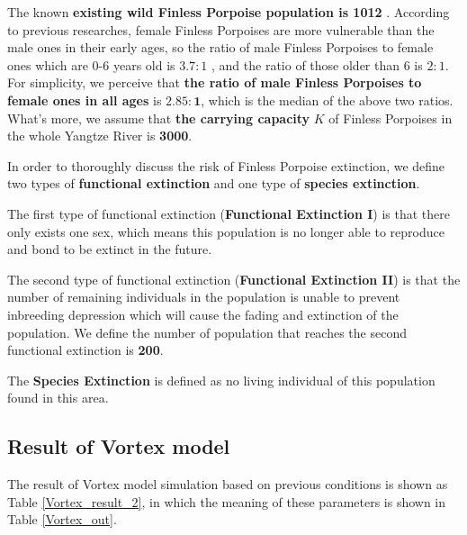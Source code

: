 \documentclass{mcmthesis}
\numberwithin{figure}{section}
\numberwithin{table}{section}
\numberwithin{equation}{section}
\begin{document}
The known \textbf{existing wild Finless Porpoise population is 1012} \citep*{Wubin}. 
According to previous researches, female Finless Porpoises are more
vulnerable than the male ones in their early ages, so the ratio of 
male Finless Porpoises to female ones which are 0-6 years old is $ 3.7:1 $
\citep*{ZhouZhao},
and the ratio of those older than 6 is $ 2:1 $. For simplicity, 
we perceive that \textbf{the ratio of male Finless Porpoises to female ones
in all ages} is $ \bm{2.85:1} $, which is the median of the above two ratios.
What's more, we assume that \textbf{the carrying capacity} $ K $  of Finless Porpoises
in the whole Yangtze River is \textbf{3000}.
\par
In order to thoroughly discuss the risk of Finless Porpoise extinction,
we define two types of \textbf{functional extinction} and one type
of \textbf{species extinction}. 
\par
The first type of functional extinction 
(\textbf{Functional Extinction I}) is that there only exists one 
sex, which means this population is no longer able to reproduce and bond 
to be extinct in the future.
\par
The second type of functional extinction
(\textbf{Functional Extinction II}) is that the number of 
remaining individuals in the population is unable to prevent inbreeding
depression which will cause the fading and extinction of the population.
We define the number of population that reaches the second functional 
extinction is \textbf{200}.
\par
The \textbf{Species Extinction} is defined as no living individual of this population
found in this area. 

\subsection{Result of Vortex model}\label{Prob_2_VortexSection}
The result of Vortex model simulation based on previous conditions 
is shown as Table \ref{Vortex_result_2}, in which the meaning of 
these parameters is shown in Table \ref{Vortex_out}.
\end{document}
